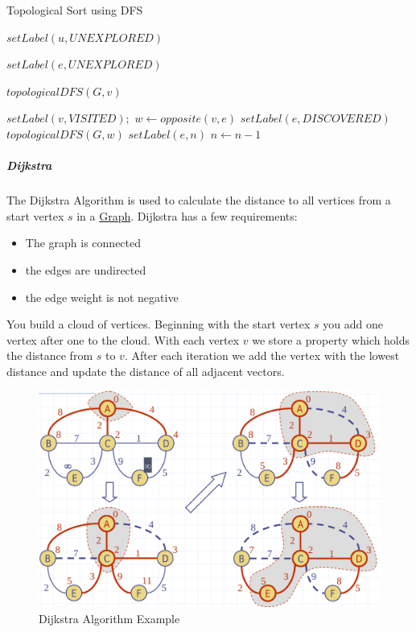 \documentclass[11pt,twoside,twocolumn,landscape]{article}
\begin{document}
\begin{algorithm}
  \caption{Topological Sort using DFS}
  \begin{algorithmic}[1]
    \State $setLabel(u, UNEXPLORED)$
    \EndFor

    \State $setLabel(e, UNEXPLORED)$
    \EndFor

    \State $topologicalDFS(G, v)$
    \EndIf
    \EndFor
    \EndProcedure
  \end{algorithmic}
  \begin{algorithmic}[1]
    \State $setLabel(v, VISITED);$
    \State $w \gets opposite(v,e)$
    \State $setLabel(e, DISCOVERED)$
    \State $topologicalDFS(G, w)$
    \Else
    \State $setLabel(e, n)$
    \EndIf
    \EndIf
    \EndFor
    \State $n \gets n - 1$
    \EndProcedure
  \end{algorithmic}
\end{algorithm}

\subparagraph{Dijkstra}
\label{sec:org7914a71}

The Dijkstra Algorithm is used to calculate the distance to all vertices from a start vertex \(s\) in a \href{../../../roam/20220201163000-graph.org}{Graph}.
Dijkstra has a few requirements:
\begin{itemize}
\item The graph is connected
\item the edges are undirected
\item the edge weight is not negative
\end{itemize}


You build a cloud of vertices.
Beginning with the start vertex \(s\) you add one vertex after one to the cloud.
With each vertex \(v\) we store a property which holds the distance from \(s\) to \(v\).
After each iteration we add the vertex with the lowest distance and update the distance of all adjacent vectors.


\begin{figure}[htbp]
\centering
\includegraphics[width=.9\linewidth]{img/dijkstra_algorithm_example.png}
\caption{\label{fig:orgce84e51}Dijkstra Algorithm Example}
\end{figure}
\end{document}
